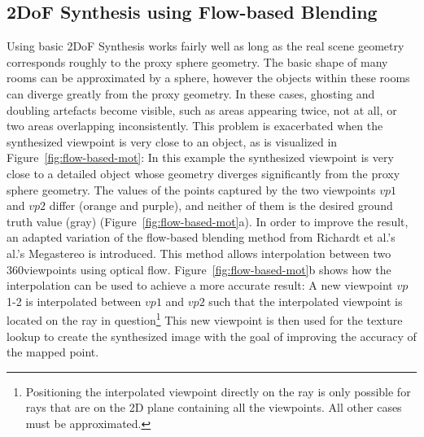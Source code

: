 
\subsection{2DoF Synthesis using Flow-based Blending}
Using basic 2DoF Synthesis works fairly well as long as the real scene geometry corresponds roughly to the proxy sphere geometry. The basic shape of many rooms can be approximated by a sphere, however the objects within these rooms can diverge greatly from the proxy geometry. In these cases, ghosting and doubling artefacts become visible, such as areas appearing twice, not at all, or two areas overlapping inconsistently. This problem is exacerbated when the synthesized viewpoint is very close to an object, as is visualized in Figure~\ref{fig:flow-based-mot}: In this example the synthesized viewpoint is very close to a detailed object whose geometry diverges significantly from the proxy sphere geometry. The values of the points captured by the two viewpoints $vp1$ and $vp2$ differ (orange and purple), and neither of them is the desired ground truth value (gray) (Figure~\ref{fig:flow-based-mot}a). In order to improve the result, an adapted variation of the flow-based blending method from Richardt et al.'s al.'s Megastereo \cite{megastereo} is introduced. This method allows interpolation between two 360\degree viewpoints using optical flow. Figure~\ref{fig:flow-based-mot}b shows how the interpolation can be used to achieve a more accurate result: A new viewpoint $vp$1-2 is interpolated between $vp1$ and $vp2$ such that the interpolated viewpoint is located on the ray in question\footnote{Positioning the interpolated viewpoint directly on the ray is only possible for rays that are on the 2D plane containing all the viewpoints. All other cases must be approximated.} This new viewpoint is then used for the texture lookup to create the synthesized image with the goal of improving the accuracy of the mapped point.

